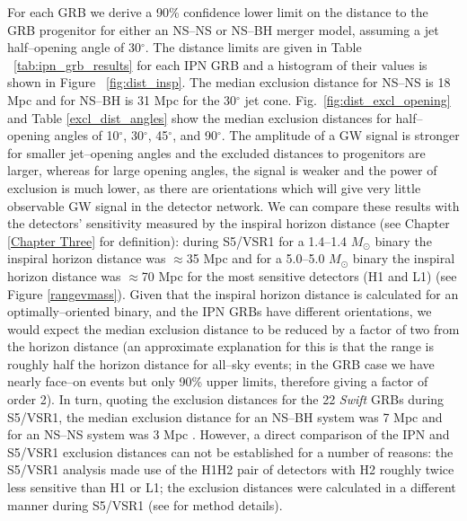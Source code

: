 For each GRB we derive a 90\% confidence lower limit on the distance to the GRB progenitor for either an NS--NS or NS--BH merger model, assuming a jet half--opening angle of 30$^\circ$. The distance limits are given in Table ~\ref{tab:ipn_grb_results} for each IPN GRB and a histogram of their values is shown in Figure ~\ref{fig:dist_insp}. The median exclusion distance for NS--NS is 18 Mpc and for NS--BH is 31 Mpc for the 30$^\circ$ jet cone. Fig.~\ref{fig:dist_excl_opening} and Table \ref{excl_dist_angles} show the median exclusion distances for half--opening angles of 10$^\circ$, 30$^\circ$, 45$^\circ$, and 90$^\circ$. The amplitude of a GW signal is stronger for smaller jet--opening angles and the excluded distances to progenitors are larger, whereas for large opening angles, the signal is weaker and the power of exclusion is much lower, as there are orientations which will give very little observable GW signal in the detector network. We can compare these results with the detectors' sensitivity measured by the inspiral horizon distance (see Chapter \ref{Chapter Three} for definition): during S5/VSR1 for a 1.4--1.4 $M_{\odot}$ binary the inspiral horizon distance was $\approx$35 Mpc and for a 5.0--5.0 $M_{\odot}$ binary the inspiral horizon distance was $\approx$70 Mpc for the most sensitive detectors (H1 and L1) (see Figure \ref{rangevmass}). Given that the inspiral horizon distance is calculated for an optimally--oriented binary, and the IPN GRBs have different orientations, we would expect the median exclusion distance to be reduced by a factor of two from the horizon distance (an approximate explanation for this is that the range is roughly half the horizon distance for all--sky events; in the GRB case we have nearly face--on events but only 90\% upper limits, therefore giving a factor of order 2). In turn, quoting the exclusion distances for the 22 \emph{Swift} GRBs during S5/VSR1, the median exclusion distance for an NS--BH system was 7 Mpc and for an NS--NS system was 3 Mpc \cite{Abadie:2010uf}. However, a direct comparison of the IPN and S5/VSR1 exclusion distances can not be established for a number of reasons: the S5/VSR1 analysis made use of the H1H2 pair of detectors with H2 roughly twice less sensitive than H1 or L1; the exclusion distances were calculated in a different manner during S5/VSR1 (see \cite{Abadie:2010uf} for method details).
 

